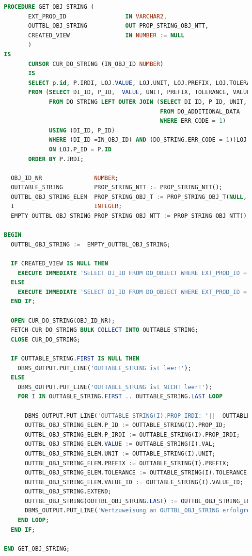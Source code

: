  \begin{lstlisting}[caption=GET\_OBJ\_STRING Anpassung auf Property ID, language=sql, label=lst:get_obj_string_anpassung]
PROCEDURE GET_OBJ_STRING (
       EXT_PROD_ID                 IN VARCHAR2,
       OUTTBL_OBJ_STRING           OUT PROP_STRING_OBJ_NTT,
       CREATED_VIEW                IN NUMBER := NULL
       )
IS     
       CURSOR CUR_DO_STRING (IN_OBJ_ID NUMBER) 
       IS
       SELECT p.id, P.IRDI, LOJ.VALUE, LOJ.UNIT, LOJ.PREFIX, LOJ.TOLERANCE, LOJ.VALUE_ID 
       FROM (SELECT DI_ID, P_ID,  VALUE, UNIT, PREFIX, TOLERANCE, VALUE_ID 
             FROM DO_STRING LEFT OUTER JOIN (SELECT DI_ID, P_ID, UNIT, PREFIX, TOLERANCE, VALUE_ID
                                             FROM DO_ADDITIONAL_DATA 
                                             WHERE ERR_CODE = 1)
             USING (DI_ID, P_ID) 
             WHERE (DI_ID =IN_OBJ_ID) AND (DO_STRING.ERR_CODE = 1))LOJ JOIN DE_PROPERTY P
             ON LOJ.P_ID = P.ID
       ORDER BY P.IRDI;      
 
  OBJ_ID_NR               NUMBER;
  OUTTABLE_STRING         PROP_STRING_NTT := PROP_STRING_NTT();
  OUTTBL_OBJ_STRING_ELEM  PROP_STRING_OBJ_T := PROP_STRING_OBJ_T(NULL, NULL, NULL, NULL, NULL, NULL, NULL);
  I                       INTEGER;
  EMPTY_OUTTBL_OBJ_STRING PROP_STRING_OBJ_NTT := PROP_STRING_OBJ_NTT();

BEGIN
  OUTTBL_OBJ_STRING :=  EMPTY_OUTTBL_OBJ_STRING;
   
  IF CREATED_VIEW IS NULL THEN
    EXECUTE IMMEDIATE 'SELECT DI_ID FROM DO_OBJECT WHERE EXT_PROD_ID = ''' || EXT_PROD_ID || ''' AND CREATED_VIEW IS NULL' INTO OBJ_ID_NR;
  ELSE
    EXECUTE IMMEDIATE 'SELECT DI_ID FROM DO_OBJECT WHERE EXT_PROD_ID = ''' || EXT_PROD_ID || ''' AND CREATED_VIEW = ' || CREATED_VIEW INTO OBJ_ID_NR ;
  END IF;
      
  OPEN CUR_DO_STRING(OBJ_ID_NR);
  FETCH CUR_DO_STRING BULK COLLECT INTO OUTTABLE_STRING; 
  CLOSE CUR_DO_STRING; 
  
  IF OUTTABLE_STRING.FIRST IS NULL THEN
    DBMS_OUTPUT.PUT_LINE('OUTTABLE_STRING ist leer!');
  ELSE 
    DBMS_OUTPUT.PUT_LINE('OUTTABLE_STRING ist NICHT leer!');
    FOR I IN OUTTABLE_STRING.FIRST .. OUTTABLE_STRING.LAST LOOP
      
      DBMS_OUTPUT.PUT_LINE('OUTTABLE_STRING(I).PROP_IRDI: '||  OUTTABLE_STRING(I).PROP_IRDI);
      OUTTBL_OBJ_STRING_ELEM.P_ID := OUTTABLE_STRING(I).PROP_ID;
      OUTTBL_OBJ_STRING_ELEM.P_IRDI := OUTTABLE_STRING(I).PROP_IRDI;
      OUTTBL_OBJ_STRING_ELEM.VALUE := OUTTABLE_STRING(I).VAL;
      OUTTBL_OBJ_STRING_ELEM.UNIT := OUTTABLE_STRING(I).UNIT;
      OUTTBL_OBJ_STRING_ELEM.PREFIX := OUTTABLE_STRING(I).PREFIX;
      OUTTBL_OBJ_STRING_ELEM.TOLERANCE := OUTTABLE_STRING(I).TOLERANCE;
      OUTTBL_OBJ_STRING_ELEM.VALUE_ID := OUTTABLE_STRING(I).VALUE_ID;
      OUTTBL_OBJ_STRING.EXTEND;
      OUTTBL_OBJ_STRING(OUTTBL_OBJ_STRING.LAST) := OUTTBL_OBJ_STRING_ELEM;
      DBMS_OUTPUT.PUT_LINE('Wertzuweisung an OUTTBL_OBJ_STRING erfolgreich!');
    END LOOP; 
  END IF;
   
END GET_OBJ_STRING;
\end{lstlisting}
 
